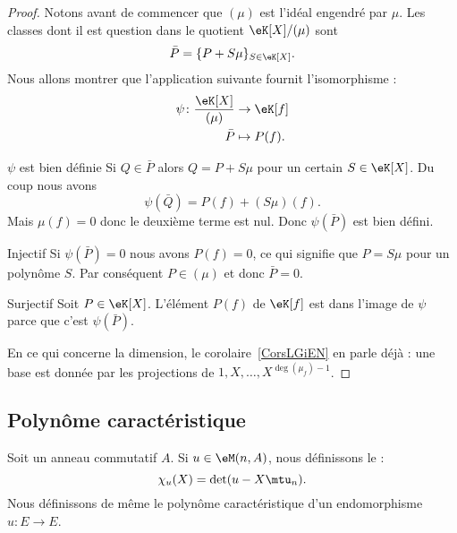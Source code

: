 \begin{proof}
    Notons avant de commencer que \( (\mu)\) est l'idéal engendré par \( \mu\). Les classes dont il est question dans le quotient \( \eK[X]/(\mu)\) sont
    \begin{equation}
        \bar P=\{ P+S\mu \}_{S\in \eK[X]}.
    \end{equation}
    Nous allons montrer que l'application suivante fournit l'isomorphisme :
    \begin{equation}
        \begin{aligned}
            \psi\colon \frac{ \eK[X] }{ (\mu) }&\to \eK[f] \\
            \bar P&\mapsto P(f).
        \end{aligned}
    \end{equation}
    \begin{subproof}
        \item[\( \psi\) est bien définie]
            Si \( Q\in \bar P\) alors \( Q=P+S\mu\) pour un certain \( S\in \eK[X]\). Du coup nous avons
            \begin{equation}
                \psi(\bar Q)=P(f)+(S\mu)(f).
            \end{equation}
            Mais \( \mu(f)=0\) donc le deuxième terme est nul. Donc \( \psi(\bar P)\) est bien défini.
        \item[Injectif]
            Si \( \psi(\bar P)=0\) nous avons \( P(f)=0\), ce qui signifie que \( P=S\mu\) pour un polynôme \( S\). Par conséquent \( P\in (\mu)\) et donc \( \bar P=0\).
        \item[Surjectif]
            Soit \( P\in \eK[X]\). L'élément \( P(f) \) de \( \eK[f]\) est dans l'image de \( \psi\) parce que c'est \( \psi(\bar P)\).
    \end{subproof}
    En ce qui concerne la dimension, le corolaire~\ref{CorsLGiEN} en parle déjà : une base est donnée par les projections de \( 1,X,\ldots, X^{\deg(\mu_f)-1}\).
\end{proof}

\subsection{Polynôme caractéristique}

\begin{definition}  \label{DefOWQooXbybYD}
    Soit un anneau commutatif \( A\). Si \( u\in\eM(n,A)\), nous définissons le  :
    \begin{equation}    \label{Eqkxbdfu}
        \chi_u(X)=\det(u-X\mtu_n).
    \end{equation}
    Nous définissons de même le polynôme caractéristique d'un endomorphisme \( u\colon E\to E\).
\end{definition}

